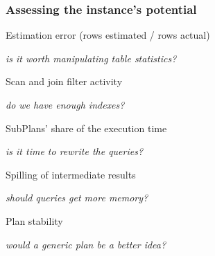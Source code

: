 \documentclass{beamer}
\begin{document}

\newcommand{\lever}[3]{%
  \noindent\makebox[0.8cm][l]{\large\bfseries\textcolor{ptoaccent}{#1}}%
  {\large\color{ptoink}#2}\par
  \vspace{1pt}
  \noindent\hspace{0.8cm}\parbox[t]{\dimexpr\linewidth-0.8cm\relax}{%
    \raggedright\small\itshape\textcolor{black!55}{#3}}\par
  \vspace{7pt}}

\begin{frame}\frametitle{Assessing the instance's potential}
\vspace*{\fill}

\lever{1}{Estimation error (rows estimated / rows actual)}
  {is it worth manipulating table statistics?}
\lever{2}{Scan and join filter activity}
  {do we have enough indexes?}
\lever{3}{SubPlans' share of the execution time}
  {is it time to rewrite the queries?}
\lever{4}{Spilling of intermediate results}
  {should queries get more memory?}
\lever{5}{Plan stability}
  {would a generic plan be a better idea?}

\vspace*{\fill}
\end{frame}

\end{document}
